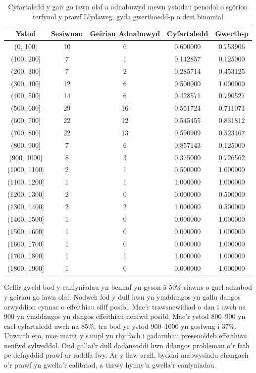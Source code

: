 \begin{table}[h]
\centering
\begin{tabular}{|c|c|c|c|c|}
\hline
\textbf{Ystod} & \textbf{Sesiwnau} & \textbf{Geiriau Adnabuwyd} & \textbf{Cyfartaledd} & \textbf{Gwerth-p} \\
\hline
(0, 100] & 10 & 6 & 0.600000 & 0.753906 \\
(100, 200] & 7 & 1 & 0.142857 & 0.125000 \\
(200, 300] & 7 & 2 & 0.285714 & 0.453125 \\
(300, 400] & 12 & 6 & 0.500000 & 1.000000 \\
(400, 500] & 14 & 6 & 0.428571 & 0.790527 \\
(500, 600] & 29 & 16 & 0.551724 & 0.711071 \\
(600, 700] & 22 & 12 & 0.545455 & 0.831812 \\
(700, 800] & 22 & 13 & 0.590909 & 0.523467 \\
(800, 900] & 7 & 6 & 0.857143 & 0.125000 \\
(900, 1000] & 8 & 3 & 0.375000 & 0.726562 \\
(1000, 1100] & 2 & 1 & 0.500000 & 1.000000 \\
(1100, 1200] & 1 & 1 & 1.000000 & 1.000000 \\
(1200, 1300] & 2 & 0 & 0.000000 & 0.500000 \\
(1300, 1400] & 2 & 2 & 1.000000 & 0.500000 \\
(1400, 1500] & 1 & 0 & 0.000000 & 1.000000 \\
(1500, 1600] & 1 & 0 & 0.000000 & 1.000000 \\
(1600, 1700] & 1 & 0 & 0.000000 & 1.000000 \\
(1700, 1800] & 1 & 1 & 1.000000 & 1.000000 \\
(1800, 1900] & 1 & 0 & 0.000000 & 1.000000 \\
\hline
\end{tabular}
\caption{Cyfartaledd y gair go iawn olaf a adnabuwyd mewn ystodau penodol o sgôrion terfynol y prawf Llydaweg, gyda gwerthoedd-p o dest binomial}
\label{tab:recognition_stats}
\end{table}

Gellir gweld bod y canlyniadau yn bennaf yn gyson â 50\% siawns o gael adnabod y geiriau go iawn olaf. Nodwch fod y dull hwn yn ymddangos yn gallu dangos arwyddion cynnar o effeithiau silff posibl. Mae'r trawsnewidiad o dan i uwch na 900 yn ymddangos yn dangos effeithiau nenfwd posibl. Mae'r ystod 800–900 yn cael cyfartaledd uwch na 85\%, tra bod yr ystod 900–1000 yn gostwng i 37\%. Unwaith eto, mae maint y sampl yn rhy fach i gadarnhau presenoldeb effeithiau nenfwd sylweddol. Ond gallai'r dull dadansoddi hwn ddangos problemau o'r fath pe defnyddid prawf ar raddfa fwy. Ar y llaw arall, byddai mabwysiadu ehangach o'r prawf yn gwella'r calibriad, a thrwy hynny'n gwella'r canlyniadau.
